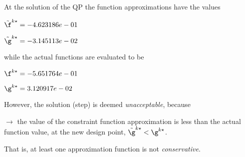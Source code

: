 At the solution of the QP the function approximations have the values

$\tilde \f^{k\star} = -4.623186e-01$

$\tilde \g^{k\star} = -3.145113e-02$

\bigskip
while the actual functions are evaluated to be

$\f^{k\star} = -5.651764e-01$

$\g^{k\star} =  3.120917e-02$

\bigskip
 However, the solution (step)                     is deemed \emph{unacceptable}, because 
 


 $\to$ the value of the constraint function                         approximation is less than the actual function value, at                         the new design point, $\tilde {\g}^{k\star} < {\g}^{k\star}$.

 \bigskip 

 That is, at least one approximation                     function is not \emph{conservative}.
